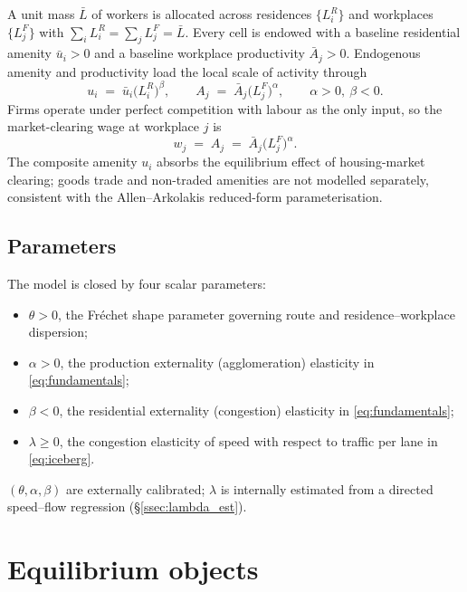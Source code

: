 \documentclass[12pt]{article}
\newcommand{\Lbar}{\bar L}
\newcommand{\ubar}{\bar u}
\newcommand{\Abar}{\bar A}
\begin{document}
A unit mass $\Lbar$ of workers is allocated across residences
$\{L_i^R\}$ and workplaces $\{L_j^F\}$ with
$\sum_i L_i^R=\sum_j L_j^F=\Lbar$.  Every cell is endowed with a
baseline residential amenity $\ubar_i>0$ and a baseline workplace
productivity $\Abar_j>0$.  Endogenous amenity and productivity load
the local scale of activity through
\begin{equation}
  u_i\;=\;\ubar_i\bigl(L_i^R\bigr)^{\beta},
  \qquad
  A_j\;=\;\Abar_j\bigl(L_j^F\bigr)^{\alpha},
  \qquad \alpha>0,\ \beta<0.
  \label{eq:fundamentals}
\end{equation}
Firms operate under perfect competition with labour as the only
input, so the market-clearing wage at workplace $j$ is
\begin{equation}
  w_j\;=\;A_j\;=\;\Abar_j\bigl(L_j^F\bigr)^{\alpha}.
  \label{eq:wage}
\end{equation}
The composite amenity $u_i$ absorbs the equilibrium effect of
housing-market clearing; goods trade and non-traded amenities are
not modelled separately, consistent with the Allen--Arkolakis
reduced-form parameterisation.

\subsection{Parameters}

The model is closed by four scalar parameters:
\begin{itemize}[leftmargin=2em,itemsep=0.2em]
  \item $\theta>0$, the Fr\'echet shape parameter governing route and
        residence--workplace dispersion;
  \item $\alpha>0$, the production externality (agglomeration)
        elasticity in \eqref{eq:fundamentals};
  \item $\beta<0$, the residential externality (congestion)
        elasticity in \eqref{eq:fundamentals};
  \item $\lambda\ge 0$, the congestion elasticity of speed with
        respect to traffic per lane in \eqref{eq:iceberg}.
\end{itemize}
$(\theta,\alpha,\beta)$ are externally calibrated; $\lambda$ is
internally estimated from a directed speed--flow regression
(\S\ref{ssec:lambda_est}).

\section{Equilibrium objects}\label{sec:objects}
\end{document}
